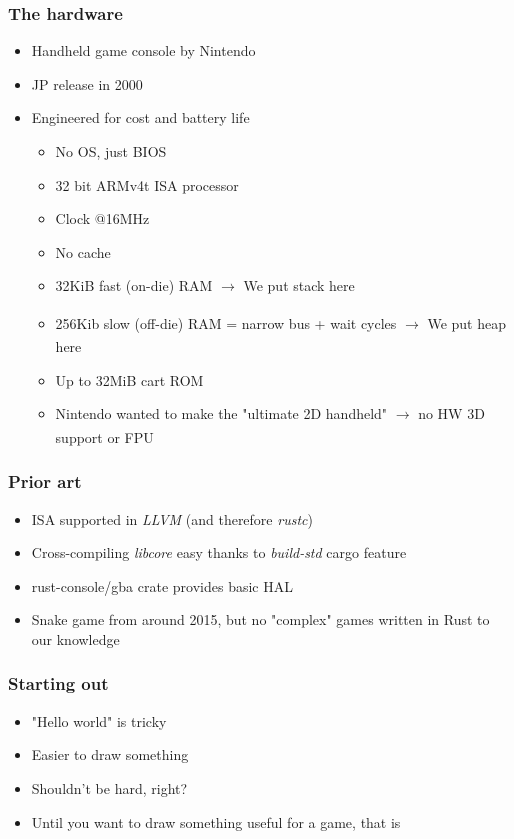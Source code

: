 \documentclass{beamer}
\begin{document}
\begin{frame}
\frametitle{The hardware}
\begin{itemize}
    \item Handheld game console by Nintendo
	\item JP release in 2000
	\item Engineered for cost and battery life \begin{itemize}
		\item No OS, just BIOS
		\item 32 bit ARMv4t ISA processor
		\item Clock @16MHz
		\item No cache
		\item 32KiB fast (on-die) RAM $\xrightarrow[]{}$ We put stack here
		\item 256Kib slow (off-die) RAM = narrow bus + wait cycles $\xrightarrow[]{}$ We put heap here
		\item Up to 32MiB cart ROM
		\item Nintendo wanted to make the "ultimate 2D handheld" $\xrightarrow[]{}$ no HW 3D support or FPU
	\end{itemize}
\end{itemize}
\end{frame}

\begin{frame}
\frametitle{Prior art}
\begin{itemize}
	\item ISA supported in \emph{LLVM} (and therefore \emph{rustc})
	\item Cross-compiling \emph{libcore} easy thanks to \emph{build-std} cargo feature
	\item rust-console/gba crate provides basic HAL
	\item Snake game from around 2015, but no "complex" games written in Rust to our knowledge
\end{itemize}
\end{frame}

\begin{frame}
\frametitle{Starting out}
\begin{itemize}
	\item "Hello world" is tricky
	\item Easier to draw something
	\item Shouldn't be hard, right?
	\item Until you want to draw something useful for a game, that is
\end{itemize}
\end{frame}
\end{document}
